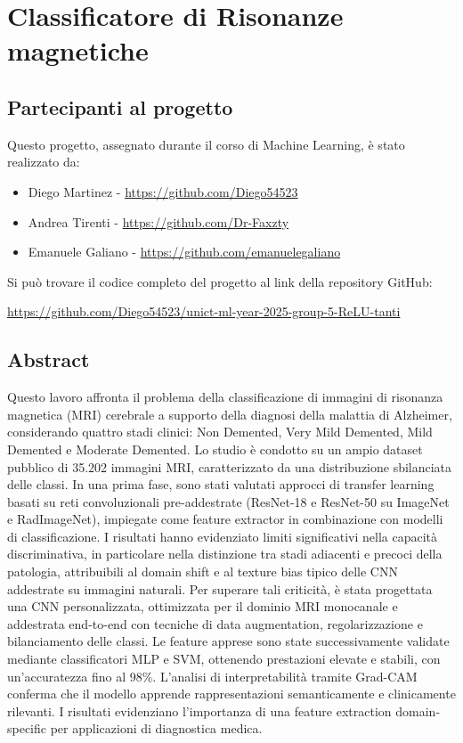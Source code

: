 \chapter{Classificatore di Risonanze magnetiche}

\section*{Partecipanti al progetto}
Questo progetto, assegnato durante il corso di Machine Learning, è stato realizzato da:
\begin{itemize}
    \item Diego Martinez - \url{https://github.com/Diego54523}
    \item Andrea Tirenti - \url{https://github.com/Dr-Faxzty}
    \item Emanuele Galiano - \url{https://github.com/emanuelegaliano}
\end{itemize}

\noindent
Si può trovare il codice completo del progetto al link della repository GitHub: 
\begin{center}
\url{https://github.com/Diego54523/unict-ml-year-2025-group-5-ReLU-tanti}
\end{center}

\section*{Abstract}
Questo lavoro affronta il problema della classificazione di immagini di risonanza magnetica (MRI) cerebrale a supporto della diagnosi della malattia di Alzheimer, considerando quattro stadi clinici: Non Demented, Very Mild Demented, Mild Demented e Moderate Demented. Lo studio è condotto su un ampio dataset pubblico di 35.202 immagini MRI, caratterizzato da una distribuzione sbilanciata delle classi. In una prima fase, sono stati valutati approcci di transfer learning basati su reti convoluzionali pre-addestrate (ResNet-18 e ResNet-50 su ImageNet e RadImageNet), impiegate come feature extractor in combinazione con modelli di classificazione. I risultati hanno evidenziato limiti significativi nella capacità discriminativa, in particolare nella distinzione tra stadi adiacenti e precoci della patologia, attribuibili al domain shift e al texture bias tipico delle CNN addestrate su immagini naturali. Per superare tali criticità, è stata progettata una CNN personalizzata, ottimizzata per il dominio MRI monocanale e addestrata end-to-end con tecniche di data augmentation, regolarizzazione e bilanciamento delle classi. Le feature apprese sono state successivamente validate mediante classificatori MLP e SVM, ottenendo prestazioni elevate e stabili, con un’accuratezza fino al 98\%. L’analisi di interpretabilità tramite Grad-CAM conferma che il modello apprende rappresentazioni semanticamente e clinicamente rilevanti. I risultati evidenziano l’importanza di una feature extraction domain-specific per applicazioni di diagnostica medica.

